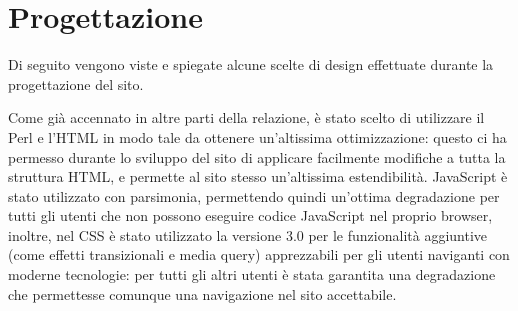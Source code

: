 \section{Progettazione}

Di seguito vengono viste e spiegate alcune scelte di design effettuate durante la progettazione del sito.


Come già accennato in altre parti della relazione, è stato scelto di utilizzare il Perl e l'HTML in modo tale da ottenere un'altissima ottimizzazione: questo ci ha permesso durante lo sviluppo del sito di applicare facilmente modifiche a tutta la struttura HTML, e permette al sito stesso un'altissima estendibilità. JavaScript è stato utilizzato con parsimonia, permettendo quindi un'ottima degradazione per tutti gli utenti che non possono eseguire codice JavaScript nel proprio browser, inoltre, nel CSS è stato utilizzato la versione 3.0 per le funzionalità aggiuntive (come effetti transizionali e media query) apprezzabili per gli utenti naviganti con moderne tecnologie: per tutti gli altri utenti è stata garantita una degradazione che permettesse comunque una navigazione nel sito accettabile.
